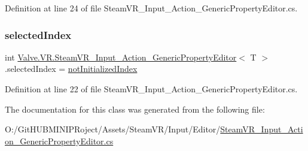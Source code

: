 Definition at line 24 of file Steam\+V\+R\+\_\+\+Input\+\_\+\+Action\+\_\+\+Generic\+Property\+Editor.\+cs.

\mbox{\label{class_valve_1_1_v_r_1_1_steam_v_r___input___action___generic_property_editor_ac15054d907ad9e3cd1b91d8b4bc0e7af}} 
\subsubsection{\texorpdfstring{selectedIndex}{selectedIndex}}
{\footnotesize\ttfamily int \mbox{\hyperlink{class_valve_1_1_v_r_1_1_steam_v_r___input___action___generic_property_editor}{Valve.\+V\+R.\+Steam\+V\+R\+\_\+\+Input\+\_\+\+Action\+\_\+\+Generic\+Property\+Editor}}$<$ T $>$.selected\+Index = \mbox{\hyperlink{class_valve_1_1_v_r_1_1_steam_v_r___input___action___generic_property_editor_ab14e59839e0fa1be62631b32eaf40f39}{not\+Initialized\+Index}}}



Definition at line 22 of file Steam\+V\+R\+\_\+\+Input\+\_\+\+Action\+\_\+\+Generic\+Property\+Editor.\+cs.



The documentation for this class was generated from the following file\+:\begin{DoxyCompactItemize}
\item 
O\+:/\+Git\+H\+U\+B\+M\+I\+N\+I\+P\+Roject/\+Assets/\+Steam\+V\+R/\+Input/\+Editor/\mbox{\hyperlink{_steam_v_r___input___action___generic_property_editor_8cs}{Steam\+V\+R\+\_\+\+Input\+\_\+\+Action\+\_\+\+Generic\+Property\+Editor.\+cs}}\end{DoxyCompactItemize}
